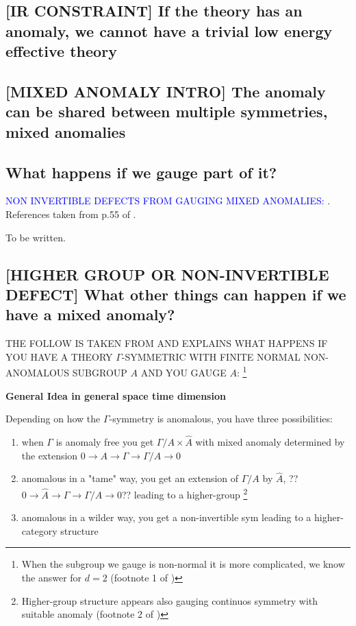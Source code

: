 \documentclass[aps,preprint,nofootinbib,preprintnumbers,eqsecnum,superscriptaddress]{revtex4}
\newcommand{\G}{\Gamma}
\newcommand{\ben}{\begin{enumerate}}
\newcommand{\een}{\end{enumerate}}
\numberwithin{equation}{section}
\begin{document}
\subsection{[IR CONSTRAINT] If the theory has an anomaly, we cannot have a trivial low energy effective theory}

\subsection{[MIXED ANOMALY INTRO] The anomaly can be shared between multiple symmetries, mixed anomalies}

\subsection{What happens if we gauge part of it?}
\textcolor{blue}{NON INVERTIBLE DEFECTS FROM GAUGING MIXED ANOMALIES:}  \cite{Kaidi_2022, Bhardwaj_2023}. References taken from p.55 of \cite{schafernameki_2023}.

To be written.

\subsection{[HIGHER GROUP OR NON-INVERTIBLE DEFECT] What other things can happen if we have a mixed anomaly?}
THE FOLLOW IS TAKEN FROM \cite{Tachikawa_2020} AND EXPLAINS WHAT HAPPENS IF YOU HAVE A THEORY $\G$-SYMMETRIC WITH FINITE NORMAL NON-ANOMALOUS SUBGROUP $A$ AND YOU GAUGE $A$: \footnote{When the subgroup we gauge is non-normal it is more complicated, we know the answer for $d=2$ (footnote 1 of \cite{Tachikawa_2020})}
\begin{tcolorbox}

{\bf General Idea in general space time dimension}

Depending on how the $\G$-symmetry is anomalous, you have three possibilities:
\ben[\itshape i)]
    \item when $\G$ is anomaly free you get $\G /A \times \hat{A}$ with mixed anomaly determined by the extension $0 \to A \to \G \to \G /A \to 0$
    \item anomalous in a "tame" way, you get an extension of $\G /A$ by $\hat{A}$, ??$0 \to \hat{A} \to \G \to \G /A \to 0$?? leading to a higher-group  \footnote{Higher-group structure appears also gauging continuos symmetry with suitable anomaly (footnote 2 of \cite{Tachikawa_2020})}
    \item anomalous in a wilder way, you get a non-invertible sym leading to a higher-category structure
\een


\end{tcolorbox} 
\end{document}
